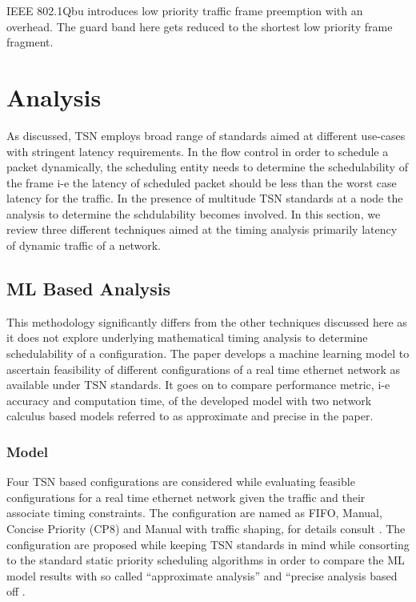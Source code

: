 \documentclass[journal,12pt,twocolumn]{IEEEtran}
\begin{document}
IEEE 802.1Qbu \cite{IEEE802.1Qbu} introduces low priority traffic frame preemption with an overhead. The guard band here gets reduced to the shortest low priority frame fragment.

\section {Analysis}
As discussed, TSN employs broad range of standards aimed at different use-cases with stringent latency requirements. In the flow control in order to schedule a packet dynamically, the scheduling entity needs to determine the schedulability of the frame i-e the latency of scheduled packet should be less than the worst case latency for the traffic. In the presence of multitude TSN standards at a node the analysis to determine the schdulability becomes involved. In this section, we review three different techniques aimed at the timing analysis primarily latency of dynamic traffic of a network.

\subsection {ML Based Analysis}
This methodology significantly differs from the other techniques discussed here as it does not explore underlying mathematical timing analysis to determine schedulability of a configuration. The paper \cite{ML} develops a machine learning model to ascertain feasibility of different configurations of a real time ethernet network as available under TSN standards. It goes on to compare performance metric, i-e accuracy and computation time, of the developed model with two network calculus based models referred to as approximate and precise in the paper.

\subsubsection{Model}
Four TSN based configurations are considered while evaluating feasible configurations for a real time ethernet network given the traffic and their associate timing constraints. The configuration are named as FIFO, Manual, Concise Priority (CP8) and Manual with traffic shaping, for details consult \cite{ML}. The configuration are proposed while keeping TSN standards in mind while consorting to the standard static priority scheduling algorithms in order to compare the ML model results with so called “approximate analysis” and “precise analysis based off  \cite{8,9,37}.
\end{document}
